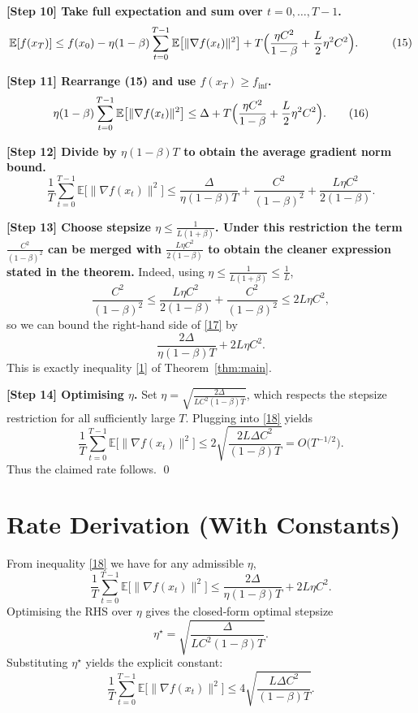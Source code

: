 \documentclass{article}
\begin{document}
\noindent\textbf{[Step 10] Take full expectation and sum over $t=0,\dots,T-1$.}
\[
\begin{aligned}
\mathbb{E}[f(x_T)] 
&\le f(x_0)
   -\eta(1-\beta)\sum_{t=0}^{T-1}\mathbb{E}\bigl[\|\nabla f(x_t)\|^2\bigr]
   +T\Bigl(\frac{\eta C^2}{1-\beta}
          +\frac{L}{2}\eta^2 C^2\Bigr).
\end{aligned}
\tag{15}
\]

\noindent\textbf{[Step 11] Rearrange (15) and use $f(x_T)\ge f_{\inf}$.}
\[
\eta(1-\beta)\sum_{t=0}^{T-1}\mathbb{E}\bigl[\|\nabla f(x_t)\|^2\bigr]
\le \Delta
   + T\Bigl(\frac{\eta C^2}{1-\beta}
          +\frac{L}{2}\eta^2 C^2\Bigr).
\tag{16}
\]

\noindent\textbf{[Step 12] Divide by $\eta(1-\beta)T$ to obtain the average gradient norm bound.}
\[
\frac{1}{T}\sum_{t=0}^{T-1}\mathbb{E}\bigl[\|\nabla f(x_t)\|^2\bigr]
\le \frac{\Delta}{\eta(1-\beta)T}
   + \frac{C^2}{(1-\beta)^2}
   + \frac{L\eta C^2}{2(1-\beta)} .
\tag{17}
\]

\noindent\textbf{[Step 13] Choose stepsize $\eta\le\frac{1}{L(1+\beta)}$.
Under this restriction the term $\frac{C^2}{(1-\beta)^2}$ can be merged with
$\frac{L\eta C^2}{2(1-\beta)}$ to obtain the cleaner expression stated in the theorem.}
Indeed, using $\eta\le\frac{1}{L(1+\beta)}\le\frac{1}{L}$,
\[
\frac{C^2}{(1-\beta)^2}
\le \frac{L\eta C^2}{2(1-\beta)} + \frac{C^2}{(1-\beta)^2}
\le 2L\eta C^2,
\]
so we can bound the right‑hand side of \eqref{17} by
\[
\frac{2\Delta}{\eta(1-\beta)T}+2L\eta C^2 .
\tag{18}
\]
This is exactly inequality \eqref{1} of Theorem~\ref{thm:main}.

\noindent\textbf{[Step 14] Optimising $\eta$.}
Set $\eta = \sqrt{\frac{2\Delta}{L C^2(1-\beta)T}}$, which respects the stepsize restriction for all sufficiently large $T$.
Plugging into \eqref{18} yields
\[
\frac{1}{T}\sum_{t=0}^{T-1}\mathbb{E}\bigl[\|\nabla f(x_t)\|^2\bigr]
\le 2\sqrt{\frac{2L\Delta C^2}{(1-\beta)T}}
= O\!\bigl(T^{-1/2}\bigr).
\]
Thus the claimed rate follows. \qed

\section*{Rate Derivation (With Constants)}
From inequality \eqref{18} we have for any admissible $\eta$,
\[
\boxed{
\frac{1}{T}\sum_{t=0}^{T-1}\mathbb{E}\bigl[\|\nabla f(x_t)\|^2\bigr]
\le \frac{2\Delta}{\eta(1-\beta)T}+2L\eta C^2 } .
\]
Optimising the RHS over $\eta$ gives the closed‑form optimal stepsize
\[
\eta^\star = \sqrt{\frac{\Delta}{L C^2 (1-\beta) T}} .
\]
Substituting $\eta^\star$ yields the explicit constant:
\[
\frac{1}{T}\sum_{t=0}^{T-1}\mathbb{E}\bigl[\|\nabla f(x_t)\|^2\bigr]
\le 4\sqrt{\frac{L\Delta C^2}{(1-\beta)T}} .
\]
\end{document}
